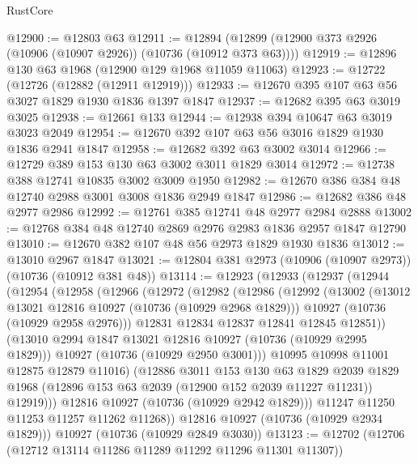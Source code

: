 \begin{lexlean}{RustCore}
\begin{coremodule}
@12900 := @12803 @63
@12911 := @12894 (@12899 (@12900 @373 @2926 (@10906 (@10907 @2926)) (@10736 (@10912 @373 @63))))
@12919 := @12896 @130 @63 @1968 (@12900 @129 @1968 @11059 @11063)
@12923 := @12722 (@12726 (@12882 (@12911 @12919)))
@12933 := @12670 @395 @107 @63 @56 @3027 @1829 @1930 @1836 @1397 @1847
@12937 := @12682 @395 @63 @3019 @3025
@12938 := @12661 @133
@12944 := @12938 @394 @10647 @63 @3019 @3023 @2049
@12954 := @12670 @392 @107 @63 @56 @3016 @1829 @1930 @1836 @2941 @1847
@12958 := @12682 @392 @63 @3002 @3014
@12966 := @12729 @389 @153 @130 @63 @3002 @3011 @1829 @3014
@12972 := @12738 @388 @12741 @10835 @3002 @3009 @1950
@12982 := @12670 @386 @384 @48 @12740 @2988 @3001 @3008 @1836 @2949 @1847
@12986 := @12682 @386 @48 @2977 @2986
@12992 := @12761 @385 @12741 @48 @2977 @2984 @2888
@13002 := @12768 @384 @48 @12740 @2869 @2976 @2983 @1836 @2957 @1847 @12790
@13010 := @12670 @382 @107 @48 @56 @2973 @1829 @1930 @1836
@13012 := @13010 @2967 @1847
@13021 := @12804 @381 @2973 (@10906 (@10907 @2973)) (@10736 (@10912 @381 @48))
@13114 := @12923
    (@12933
      (@12937
        (@12944
          (@12954
            (@12958
              (@12966
                (@12972
                  (@12982
                    (@12986
                      (@12992
                        (@13002
                          (@13012 @13021 @12816 @10927 (@10736 (@10929 @2968 @1829)))
                          @10927
                          (@10736 (@10929 @2958 @2976)))
                        @12831
                        @12834
                        @12837
                        @12841
                        @12845
                        @12851))
                    (@13010 @2994 @1847 @13021 @12816 @10927 (@10736 (@10929 @2995 @1829)))
                    @10927
                    (@10736 (@10929 @2950 @3001)))
                  @10995
                  @10998
                  @11001
                  @12875
                  @12879
                  @11016)
                (@12886
                  @3011
                  @153
                  @130
                  @63
                  @1829
                  @2039
                  @1829
                  @1968
                  (@12896 @153 @63 @2039 (@12900 @152 @2039 @11227 @11231))
                  @12919)))
            @12816
            @10927
            (@10736 (@10929 @2942 @1829)))
          @11247
          @11250
          @11253
          @11257
          @11262
          @11268))
      @12816
      @10927
      (@10736 (@10929 @2934 @1829)))
    @10927
    (@10736 (@10929 @2849 @3030))
@13123 := @12702 (@12706 (@12712 @13114 @11286 @11289 @11292 @11296 @11301 @11307))

\end{coremodule}
\end{lexlean}
